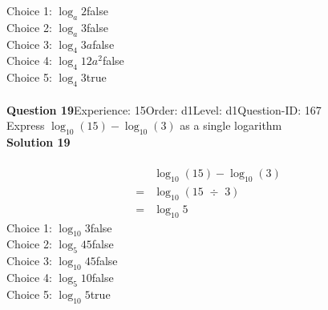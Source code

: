 \documentclass{article}
\begin{document}
Choice 1: \hspace{20pt}$\log_{a}2$\hspace{20pt}false\\
Choice 2: \hspace{20pt}$\log_{a}3$\hspace{20pt}false\\
Choice 3: \hspace{20pt}$\log_{4}3a$\hspace{20pt}false\\
Choice 4: \hspace{20pt}$\log_{4}12a^2$\hspace{20pt}false\\
Choice 5: \hspace{20pt}$\log_{4}3$\hspace{20pt}true\\
\\[4pt]
\noindent\textbf{Question 19}\hspace{20pt}Experience: 15\hspace{20pt}Order: d1\hspace{20pt}Level: d1\hspace{20pt}Question-ID: 167\\[2pt]
Express $\log_{10}(15)-\log_{10}(3)$ as a single logarithm\\[4pt]
\noindent\textbf{Solution 19}\\[2pt]
\\[-35pt]\begin{align*}
&\log_{10}(15)-\log_{10}(3)\\[2pt]
=&\log_{10}(15 \,\, \div \,\, 3)\\[2pt]
=&\log_{10}5
\end{align*}
Choice 1: \hspace{20pt}$\log_{10}3$\hspace{20pt}false\\
Choice 2: \hspace{20pt}$\log_{5}45$\hspace{20pt}false\\
Choice 3: \hspace{20pt}$\log_{10}45$\hspace{20pt}false\\
Choice 4: \hspace{20pt}$\log_{5}10$\hspace{20pt}false\\
Choice 5: \hspace{20pt}$\log_{10}5$\hspace{20pt}true\\
\end{document}
